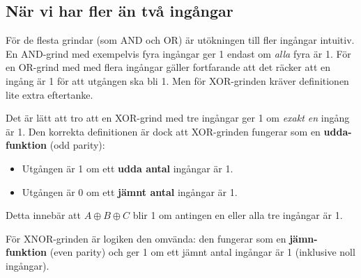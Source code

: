 \documentclass[
  swedish,
  letterpaper,
  oneside,
  openany]{book}
\providecommand{\tightlist}{%
  \setlength{\itemsep}{0pt}\setlength{\parskip}{0pt}}
\begin{document}
\subsection{När vi har fler än två
ingångar}\label{nuxe4r-vi-har-fler-uxe4n-tvuxe5-inguxe5ngar}

För de flesta grindar (som AND och OR) är utökningen till fler ingångar
intuitiv. En AND-grind med exempelvis fyra ingångar ger 1 endast om
\emph{alla} fyra är 1. För en OR-grind med med flera ingångar gäller
fortfarande att det räcker att en ingång är 1 för att utgången ska bli
1. Men för XOR-grinden kräver definitionen lite extra eftertanke.

\begin{tcolorbox}[enhanced jigsaw, arc=.35mm, bottomrule=.15mm, bottomtitle=1mm, breakable, colback=white, colbacktitle=quarto-callout-important-color!10!white, colframe=quarto-callout-important-color-frame, coltitle=black, left=2mm, leftrule=.75mm, opacityback=0, opacitybacktitle=0.6, rightrule=.15mm, title=\textcolor{quarto-callout-important-color}{\faExclamation}\hspace{0.5em}{XOR och XNOR med fler än två ingångar}, titlerule=0mm, toprule=.15mm, toptitle=1mm]

Det är lätt att tro att en XOR-grind med tre ingångar ger 1 om
\emph{exakt en} ingång är 1. Den korrekta definitionen är dock att
XOR-grinden fungerar som en \textbf{udda-funktion} (odd parity):

\begin{itemize}
\tightlist
\item
  Utgången är 1 om ett \textbf{udda antal} ingångar är 1.
\item
  Utgången är 0 om ett \textbf{jämnt antal} ingångar är 1.
\end{itemize}

Detta innebär att \(A \oplus B \oplus C\) blir 1 om antingen en eller
alla tre ingångar är 1.

\end{tcolorbox}

För XNOR-grinden är logiken den omvända: den fungerar som en
\textbf{jämn-funktion} (even parity) och ger 1 om ett jämnt antal
ingångar är 1 (inklusive noll ingångar).
\end{document}
